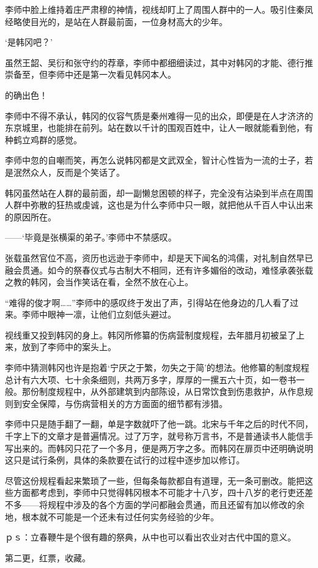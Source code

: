 李师中脸上维持着庄严肃穆的神情，视线却盯上了周围人群中的一人。吸引住秦凤经略使目光的，是站在人群最前面，一位身材高大的少年。

‘是韩冈吧？’

虽然王韶、吴衍和张守约的荐章，李师中都细细读过，其中对韩冈的才能、德行推崇备至，但李师中还是第一次看见韩冈本人。

的确出色！

李师中不得不承认，韩冈的仪容气质是秦州难得一见的出众，即便是在人才济济的东京城里，也能排在前列。站在数以千计的围观百姓中，让人一眼就能看到他，有种鹤立鸡群的感觉。

李师中忽的自嘲而笑，再怎么说韩冈都是文武双全，智计心性皆为一流的士子，若是泯然众人，反而是个笑话了。

韩冈虽然站在人群的最前面，却一副懒怠困顿的样子，完全没有沾染到半点在周围人群中弥散的狂热或虔诚，这也是为什么李师中只一眼，就把他从千百人中认出来的原因所在。

——‘毕竟是张横渠的弟子。’李师中不禁感叹。

张载虽然官位不高，资历也远逊于李师中，却是天下闻名的鸿儒，对礼制自然早已融会贯通。如今的祭春仪式与古制大不相同，还有许多媚俗的改动，难怪承袭张载之教的韩冈，会当作笑话在看，全然不放在心上。

“难得的俊才啊……”李师中的感叹终于发出了声，引得站在他身边的几人看了过来。李师中眼神一凛，让他们立刻低头避过。

视线重又投到韩冈的身上。韩冈所修纂的伤病营制度规程，去年腊月初被呈了上来，放到了李师中的案头上。

李师中猜测韩冈也许是抱着‘宁厌之于繁，勿失之于简’的想法。他修纂的制度规程总计有六大项、七十余条细则，共两万多字，厚厚的一摞五六十页，如一卷书一般。那份制度规程中，从外部建筑到内部陈设，从日常饮食到伤患救护，从作息规则到安全保障，与伤病营相关的方方面面的细节都有涉猎。

李师中只是随手翻了一翻，单是字数就吓了他一跳。北宋与千年之后的时代不同，千字上下的文章才是普遍情况。过了万字，就号称万言书，不是普通读书人能信手写出来的。而韩冈只花了一个多月，便是两万字之多。而韩冈在扉页中还明确说明这只是试行条例，具体的条款要在试行的过程中逐步加以修订。

尽管这份规程看起来繁琐了一些，但每条每款都自有道理，无一条可删改。能把这些方面都考虑到，李师中只觉得韩冈根本不可能才十八岁，四十八岁的老行吏还差不多——将规程中涉及的各个方面的学问都融会贯通，而且还留有加以修改的余地，根本就不可能是一个还未有过任何实务经验的少年。

ｐｓ：立春鞭牛是个很有趣的祭典，从中也可以看出农业对古代中国的意义。

第二更，红票，收藏。


